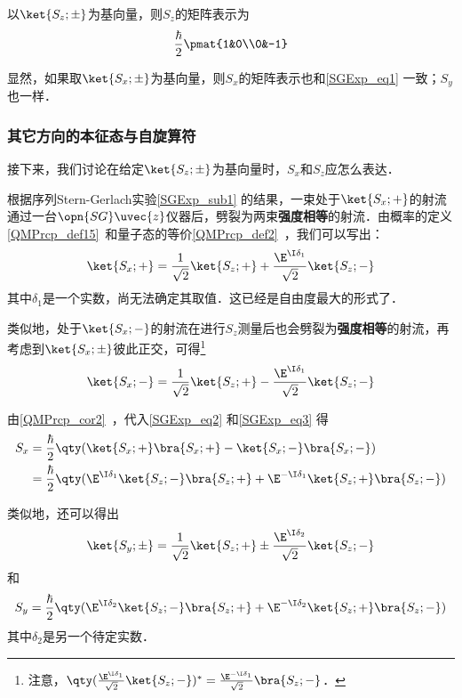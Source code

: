 以$\ket{S_z; \pm}$为基向量，则$S_z$的矩阵表示为
\begin{equation}\label{SGExp_eq1}
\frac{\hbar}{2}\pmat{1&0\\0&-1}
\end{equation}


显然，如果取$\ket{S_x; \pm}$为基向量，则$S_x$的矩阵表示也和\autoref{SGExp_eq1} 一致；$S_y$也一样．



\subsubsection{其它方向的本征态与自旋算符}


接下来，我们讨论在给定$\ket{S_z; \pm}$为基向量时，$S_x$和$S_z$应怎么表达．

根据序列Stern-Gerlach实验\autoref{SGExp_sub1} 的结果，一束处于$\ket{S_x; +}$的射流通过一台$\opn{SG}\uvec{z}$仪器后，劈裂为两束\textbf{强度相等}的射流．由概率的定义\autoref{QMPrcp_def15}~和量子态的等价\autoref{QMPrcp_def2}~，我们可以写出：
\begin{equation}\label{SGExp_eq2}
\ket{S_x; +}=\frac{1}{\sqrt{2}}\ket{S_z; +}+\frac{\E^{\I \delta_1}}{\sqrt{2}}\ket{S_z; -}
\end{equation}
其中$\delta_1$是一个实数，尚无法确定其取值．这已经是自由度最大的形式了．

类似地，处于$\ket{S_x; -}$的射流在进行$S_z$测量后也会劈裂为\textbf{强度相等}的射流，再考虑到$\ket{S_x; \pm}$彼此正交，可得\footnote{注意，$\qty(\frac{\E^{\I \delta_1}}{\sqrt{2}}\ket{S_z; -})^*=\frac{\E^{-\I \delta_1}}{\sqrt{2}}\bra{S_z; -}$．}
\begin{equation}\label{SGExp_eq3}
\ket{S_x; -}=\frac{1}{\sqrt{2}}\ket{S_z; +}-\frac{\E^{\I \delta_1}}{\sqrt{2}}\ket{S_z; -}
\end{equation}


由\autoref{QMPrcp_cor2}~，代入\autoref{SGExp_eq2} 和\autoref{SGExp_eq3} 得
\begin{equation}\label{SGExp_eq4}
\begin{aligned}
S_x &= \frac{\hbar}{2}\qty(\ket{S_x; +}\bra{S_x; +}-\ket{S_x; -}\bra{S_x; -})\\
&=\frac{\hbar}{2}\qty(\E^{\I\delta_1}\ket{S_z; -}\bra{S_z; +} + \E^{-\I\delta_1}\ket{S_z; +}\bra{S_z; -})
\end{aligned}
\end{equation}

类似地，还可以得出
\begin{equation}\label{SGExp_eq7}
\ket{S_y; \pm} = \frac{1}{\sqrt{2}}\ket{S_z; +}\pm\frac{\E^{\I\delta_2}}{\sqrt{2}}\ket{S_z; -}
\end{equation}
和
\begin{equation}\label{SGExp_eq5}
S_y=\frac{\hbar}{2}\qty(\E^{\I\delta_2}\ket{S_z; -}\bra{S_z; +} + \E^{-\I\delta_2}\ket{S_z; +}\bra{S_z; -})
\end{equation}
其中$\delta_2$是另一个待定实数．

